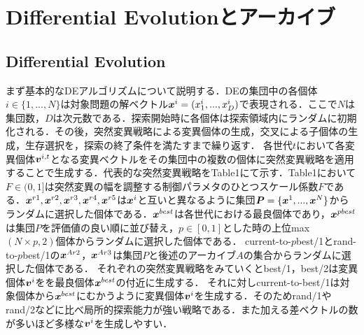 \documentclass[a4paper,11pt,oneside,openany]{jsbook}
\def\vector#1{\mbox{\boldmath $#1$}}
\begin{document}
\chapter{Differential Evolutionとアーカイブ}
\section{Differential Evolution}
まず基本的なDEアルゴリズムについて説明する．DEの集団中の各個体$i \in \{1, ..., N\}$は対象問題の解ベクトル$\vector{x}^i = (x^i_1, ..., x^i_D)$で表現される．ここで$N$は集団数，$D$は次元数である．探索開始時に各個体は探索領域内にランダムに初期化される．その後，突然変異戦略による変異個体の生成，交叉による子個体の生成，生存選択を，探索の終了条件を満たすまで繰り返す．
各世代$t$において各変異個体${\vector{v}^{i,t}}$となる変異ベクトルをその集団中の複数の個体に突然変異戦略を適用することで生成する．代表的な突然変異戦略をTable1にて示す．Table1において${F\in(0,1]}$は突然変異の幅を調整する制御パラメタのひとつスケール係数$F$である．$\vector{x}^{r1},\vector{x}^{r2},\vector{x}^{r3},\vector{x}^{r4},\vector{x}^{r5}$は${\vector{x}^i}$と互いと異なるように集団$\vector{P} = \{ \vector{x}^1, ..., \vector{x}^N \}$からランダムに選択した個体である．$\vector{x}^{best}$は各世代における最良個体であり，$\vector{x}^{pbest}$は集団$P$を評価値の良い順に並び替え，${p\in[0,1]}とした時の上位$max$(N \times p, 2)$個体からランダムに選択した個体である．
current-to-$p$best/1とrand-to-$p$best/1の${\vector{x}^{Ar2}}$，${\vector{x}^{Ar3}}$は集団$P$と後述のアーカイブ$A$の集合からランダムに選択した個体である．
それぞれの突然変異戦略をみていくとbest/1，best/2は変異個体{$\vector{v}^i$}をを最良個体$\vector{x}^{best}$の付近に生成する．
それに対しcurrent-to-best/1は対象個体から$\vector{x}^{best}$にむかうように変異個体{$\vector{v}^i$}を生成する．そのためrand/1やrand/2などに比べ局所的探索能力が強い戦略である．また加える差ベクトルの数が多いほど多様な{$\vector{v}^i$}を生成しやすい．
\end{document}
